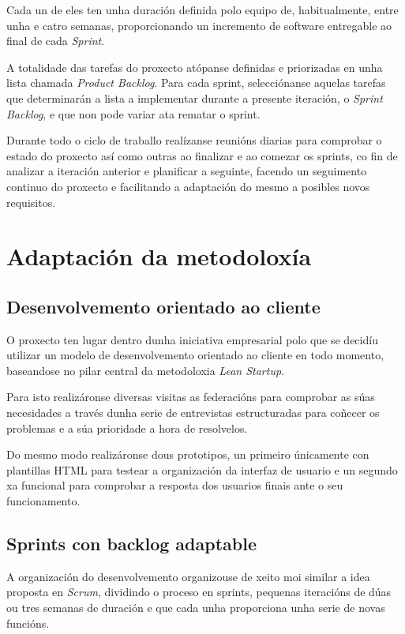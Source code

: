   Cada un de eles ten unha duración definida polo equipo de, habitualmente, 
entre unha e catro semanas, proporcionando un incremento de software entregable 
ao final de cada \emph{Sprint}.

  A totalidade das tarefas do proxecto atópanse definidas e priorizadas en unha 
lista chamada \emph{Product Backlog}. Para cada sprint, selecciónanse aquelas 
tarefas que determinarán a lista a implementar durante a presente iteración, o
\emph{Sprint Backlog}, e que non pode variar ata rematar o sprint.

  Durante todo o ciclo de traballo realízanse reunións diarias para comprobar o 
estado do proxecto así como outras ao finalizar e ao comezar os sprints, co 
fin de analizar a iteración anterior e planificar a seguinte, facendo un 
seguimento continuo do proxecto e facilitando a adaptación do mesmo a posibles 
novos requisitos.

  \section{Adaptación da metodoloxía}

    \subsection{Desenvolvemento orientado ao cliente}
      O proxecto ten lugar dentro dunha iniciativa empresarial polo que se 
decidíu utilizar un modelo de desenvolvemento orientado ao cliente en todo 
momento, baseandose no pilar central da metodoloxia \emph{Lean Startup}.

    Para isto realizáronse diversas visitas as federacións para comprobar as 
súas necesidades a través dunha serie de entrevistas estructuradas para 
coñecer os problemas e a súa prioridade a hora de resolvelos.

    Do mesmo modo realizáronse dous prototipos, un primeiro únicamente 
con plantillas HTML para testear a organización da interfaz de usuario e un 
segundo xa funcional para comprobar a resposta dos usuarios finais ante o seu 
funcionamento.

    \subsection{Sprints con backlog adaptable}
    A organización do desenvolvemento organizouse de xeito moi similar a idea 
proposta en \emph{Scrum}, dividindo o proceso en sprints, pequenas iteracións 
de dúas ou tres semanas de duración e que cada unha proporciona unha serie de 
novas funcións.

